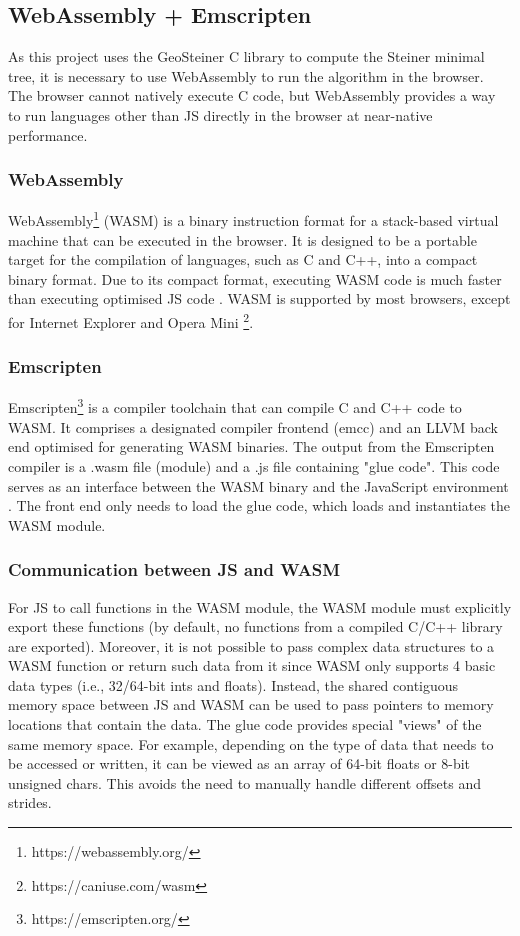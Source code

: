 \documentclass{l4proj}
\begin{document}
\subsection{WebAssembly + Emscripten}
As this project uses the GeoSteiner C library to compute the Steiner minimal tree, it is necessary to use WebAssembly to run the algorithm in the browser. The browser cannot natively execute C code, but WebAssembly provides a way to run languages other than JS directly in the browser at near-native performance.
\subsubsection{WebAssembly}
WebAssembly\footnote{https://webassembly.org/} (WASM) is a binary instruction format for a stack-based virtual machine that can be executed in the browser. It is designed to be a portable target for the compilation of languages, such as C and C++, into a compact binary format.
Due to its compact format, executing WASM code is much faster than executing optimised JS code \citep{WebAssemblyIntro}.
WASM is supported by most browsers, except for Internet Explorer and Opera Mini \footnote{https://caniuse.com/wasm}.

\subsubsection{Emscripten}
\label{sec:emscripten}
Emscripten\footnote{https://emscripten.org/} is a compiler toolchain that can compile C and C++ code to WASM. It comprises a designated compiler frontend (emcc) and an LLVM back end optimised for generating WASM binaries.
The output from the Emscripten compiler is a .wasm file (module) and a .js file containing "glue code". This code serves as an interface between the WASM binary and the JavaScript environment \citep{Emscripten_tutorial}. The front end only needs to load the glue code, which loads and instantiates the WASM module.

\subsubsection{Communication between JS and WASM}
\label{sec:js_wasm_communication}
For JS to call functions in the WASM module, the WASM module must explicitly export these functions (by default, no functions from a compiled C/C++ library are exported).
Moreover, it is not possible to pass complex data structures to a WASM function or return such data from it since WASM only supports 4 basic data types (i.e., 32/64-bit ints and floats).
Instead, the shared contiguous memory space between JS and WASM can be used to pass pointers to memory locations that contain the data.
The glue code provides special "views" of the same memory space. For example, depending on the type of data that needs to be accessed or written, it can be viewed as an array of 64-bit floats or 8-bit unsigned chars.
This avoids the need to manually handle different offsets and strides.
\end{document}
